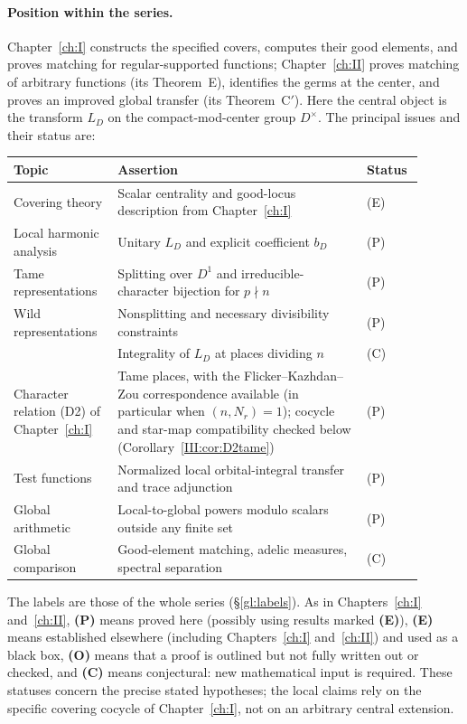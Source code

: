 \paragraph{Position within the series.}
Chapter~\ref{ch:I} constructs the specified covers, computes their good elements, and
proves matching for regular-supported functions; Chapter~\ref{ch:II} proves matching of
arbitrary functions (its Theorem~E), identifies the germs at the center, and
proves an improved global transfer (its Theorem~C$'$). Here the central object
is the transform $L_D$ on the compact-mod-center group $D^\times$.
The principal issues and their status are:
\begin{center}
\small
\begin{tabular}{@{}p{0.23\linewidth}p{0.57\linewidth}p{0.10\linewidth}@{}}
\toprule
\textbf{Topic} & \textbf{Assertion} & \textbf{Status}\\
\midrule
Covering theory & Scalar centrality and good-locus description from Chapter~\ref{ch:I} & (E)\\
Local harmonic analysis & Unitary $L_D$ and explicit coefficient $b_D$ & (P)\\
Tame representations & Splitting over $D^1$ and irreducible-character bijection for $p\nmid n$ & (P)\\
Wild representations & Nonsplitting and necessary divisibility constraints & (P)\\
 & Integrality of $L_D$ at places dividing $n$ & (C)\\
Character relation (D2) of Chapter~\ref{ch:I} & Tame places, with the Flicker--Kazhdan--Zou correspondence available (in particular when $(n,N_r)=1$); cocycle and star-map compatibility checked below (Corollary~\ref{III:cor:D2tame}) & (P)\\
Test functions & Normalized local orbital-integral transfer and trace adjunction & (P)\\
Global arithmetic & Local-to-global powers modulo scalars outside any finite set & (P)\\
Global comparison & Good-element matching, adelic measures, spectral separation & (C)\\
\bottomrule
\end{tabular}
\end{center}
The labels are those of the whole series (\S\ref{gl:labels}). As in Chapters~\ref{ch:I} and~\ref{ch:II}, \textbf{(P)} means proved here (possibly using
results marked \textbf{(E)}), \textbf{(E)} means established elsewhere
(including Chapters~\ref{ch:I} and~\ref{ch:II}) and used as a black box, \textbf{(O)} means that
a proof is outlined but not fully written out or checked, and \textbf{(C)}
means conjectural: new mathematical input is required.
These statuses concern the precise stated hypotheses; the local
claims rely on the specific covering cocycle of Chapter~\ref{ch:I}, not on
an arbitrary central extension.

